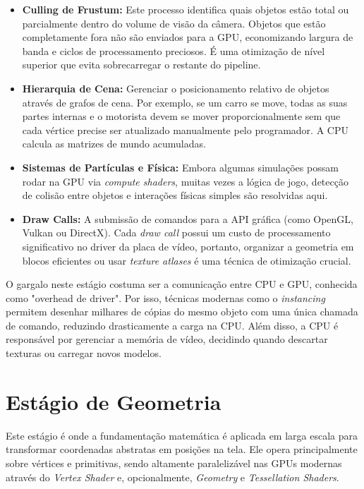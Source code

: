 \begin{itemize}
    \item \textbf{Culling de Frustum:} Este processo identifica quais objetos estão total ou parcialmente dentro do volume de visão da câmera. Objetos que estão completamente fora não são enviados para a GPU, economizando largura de banda e ciclos de processamento preciosos. É uma otimização de nível superior que evita sobrecarregar o restante do pipeline.
    \item \textbf{Hierarquia de Cena:} Gerenciar o posicionamento relativo de objetos através de grafos de cena. Por exemplo, se um carro se move, todas as suas partes internas e o motorista devem se mover proporcionalmente sem que cada vértice precise ser atualizado manualmente pelo programador. A CPU calcula as matrizes de mundo acumuladas.
    \item \textbf{Sistemas de Partículas e Física:} Embora algumas simulações possam rodar na GPU via \textit{compute shaders}, muitas vezes a lógica de jogo, detecção de colisão entre objetos e interações físicas simples são resolvidas aqui.
    \item \textbf{Draw Calls:} A submissão de comandos para a API gráfica (como OpenGL, Vulkan ou DirectX). Cada \textit{draw call} possui um custo de processamento significativo no driver da placa de vídeo, portanto, organizar a geometria em blocos eficientes ou usar \textit{texture atlases} é uma técnica de otimização crucial.
\end{itemize}

O gargalo neste estágio costuma ser a comunicação entre CPU e GPU, conhecida como "overhead de driver". Por isso, técnicas modernas como o \textit{instancing} permitem desenhar milhares de cópias do mesmo objeto com uma única chamada de comando, reduzindo drasticamente a carga na CPU. Além disso, a CPU é responsável por gerenciar a memória de vídeo, decidindo quando descartar texturas ou carregar novos modelos.

\section{Estágio de Geometria}

Este estágio é onde a fundamentação matemática é aplicada em larga escala para transformar coordenadas abstratas em posições na tela. Ele opera principalmente sobre vértices e primitivas, sendo altamente paralelizável nas GPUs modernas através do \textit{Vertex Shader} e, opcionalmente, \textit{Geometry} e \textit{Tessellation Shaders}.

